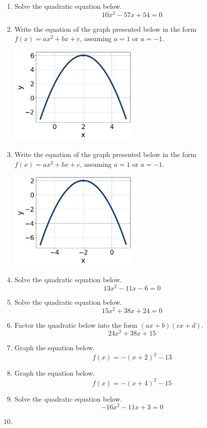 \documentclass[14pt]{extbook}
\begin{document}
\begin{enumerate}
\item{
Solve the quadratic equation below.\[ 10x^{2} -57 x + 54 = 0 \]} \newpage
\item{
Write the equation of the graph presented below in the form $f(x)=ax^2+bx+c$, assuming  $a=1$ or $a=-1$.
\begin{center}
    \includegraphics[width=0.5\textwidth]{../Figures/quadraticGraphToEquationCopyB.png}
\end{center}
} \newpage
\item{
Write the equation of the graph presented below in the form $f(x)=ax^2+bx+c$, assuming  $a=1$ or $a=-1$.
\begin{center}
    \includegraphics[width=0.5\textwidth]{../Figures/quadraticGraphToEquationB.png}
\end{center}
} \newpage
\item{
Solve the quadratic equation below.\[ 13x^{2} -11 x -6 = 0 \]} \newpage
\item{
Solve the quadratic equation below.\[ 15x^{2} +38 x + 24 = 0 \]} \newpage
\item{
Factor the quadratic below into the form $(ax+b)(cx+d)$.\[ 24x^{2} +38 x + 15 \]} \newpage
\item{
Graph the equation below.\[ f(x) = -(x+2)^2 - 13 \]} \newpage
\item{
Graph the equation below.\[ f(x) = -(x+4)^2 - 15 \]} \newpage
\item{
Solve the quadratic equation below.\[ -16x^{2} -11 x + 3 = 0 \]} \newpage
\item{
}
\end{enumerate}
\end{document}

